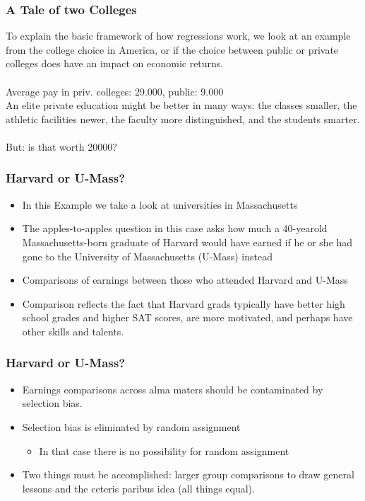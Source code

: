 \documentclass{beamer}
\begin{document}
\begin{frame}
\frametitle{A Tale of two Colleges}
To explain the basic framework of how regressions work, we look at an example from the college choice in America, or if the choice between public or private colleges does have an impact on economic returns.
\\~\\
Average pay in priv. colleges: 29.000, public: 9.000 \\

An elite private education might be better in many ways: the classes smaller, the athletic facilities newer, the faculty more distinguished, and the students smarter.
\\~\\
But: is that worth 20000?

\end{frame}
\begin{frame}
\frametitle{Harvard or U-Mass?}
\begin{itemize}
\item In this Example we take a look at universities in Massachusetts
\item The apples-to-apples question in this case asks how much a 40-yearold Massachusetts-born graduate of Harvard would have earned if he or she had gone to the University of Massachusetts (U-Mass) instead
\item Comparisons of earnings between those who attended Harvard and U-Mass
\item Comparison reflects the fact that Harvard grads typically have better high school grades and higher SAT scores, are more motivated, and perhaps have other skills and talents.
\end{itemize}

\end{frame}
\begin{frame}
\frametitle{Harvard or U-Mass?}
\begin{itemize}
\item Earnings comparisons across alma maters should be contaminated by selection bias.
\item Selection bias is eliminated by random assignment 
		\begin{itemize}
			\item[\Rightarrow] In that case there is no possibility for random assignment
		\end{itemize}
\item Two things must be accomplished: larger group comparisons to draw general lessons and the ceteris paribus idea (all things equal).
\end{itemize} 
\end{frame}
\end{document}
